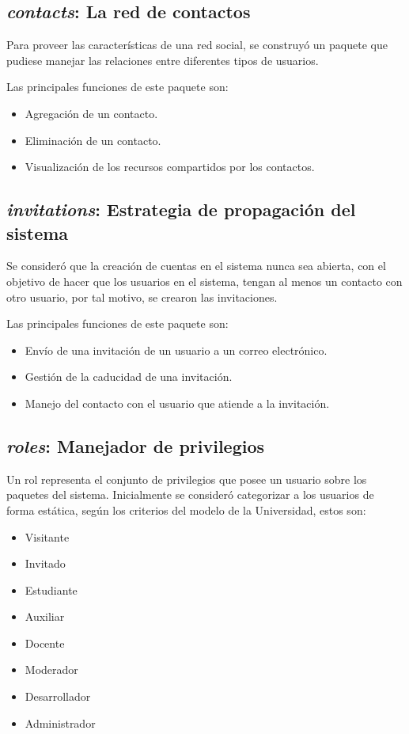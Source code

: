 \subsection{\emph{contacts}: La red de contactos}
Para proveer las características de una red social, se construyó un paquete que
pudiese manejar las relaciones entre diferentes tipos de usuarios.

Las principales funciones de este paquete son:

\begin{itemize}
\item Agregación de un contacto.
\item Eliminación de un contacto.
\item Visualización de los recursos compartidos por los contactos.
\end{itemize}

\subsection{\emph{invitations}: Estrategia de propagación del sistema}
Se consideró que la creación de cuentas en el sistema nunca sea abierta, con el
objetivo de hacer que los usuarios en el sistema, tengan al menos un contacto
con otro usuario, por tal motivo, se crearon las invitaciones.

Las principales funciones de este paquete son:

\begin{itemize}
\item Envío de una invitación de un usuario a un correo electrónico.
\item Gestión de la caducidad de una invitación.
\item Manejo del contacto con el usuario que atiende a la invitación.
\end{itemize}

\subsection{\emph{roles}: Manejador de privilegios}
Un rol representa el conjunto de privilegios que posee un usuario sobre los
paquetes del sistema.
Inicialmente se consideró categorizar a los usuarios de forma estática, según
los criterios del modelo de la Universidad, estos son:

\begin{itemize}
\item Visitante
\item Invitado
\item Estudiante
\item Auxiliar
\item Docente
\item Moderador
\item Desarrollador
\item Administrador
\end{itemize}

